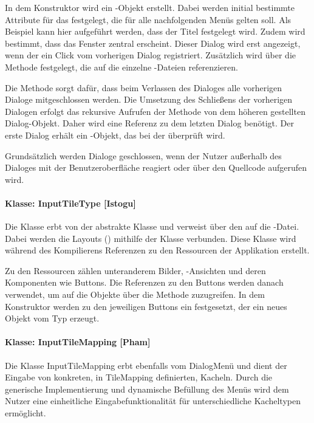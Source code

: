 In dem Konstruktor wird ein -Objekt erstellt. Dabei werden initial bestimmte Attribute für das  festgelegt, die für alle nachfolgenden Menüs gelten soll. Als Beispiel kann hier aufgeführt werden, dass der Titel festgelegt wird. Zudem wird bestimmt, dass das Fenster zentral erscheint. Dieser Dialog wird erst angezeigt, wenn der  ein Click vom vorherigen Dialog registriert. Zusätzlich wird  über die Methode  festgelegt, die auf die einzelne -Dateien referenzieren. 

Die Methode  sorgt dafür, dass beim Verlassen des Dialoges alle vorherigen Dialoge mitgeschlossen werden. Die Umsetzung des Schließens der vorherigen Dialogen erfolgt das rekursive Aufrufen der Methode  von dem höheren gestellten Dialog-Objekt. Daher wird eine Referenz zu dem letzten Dialog benötigt. Der erste Dialog erhält ein -Objekt, das bei der  überprüft wird.   

Grundsätzlich werden Dialoge geschlossen, wenn der Nutzer außerhalb des Dialoges mit der Benutzeroberfläche reagiert oder über den Quellcode  aufgerufen wird.  

\paragraph{Klasse: InputTileType [Istogu]}

Die Klasse erbt von der abstrakte Klasse  und verweist über den  auf die -Datei. Dabei werden die Layouts () mithilfe der Klasse  verbunden. Diese Klasse wird während des Kompilierens Referenzen zu den Ressourcen der Applikation erstellt. 

Zu den Ressourcen zählen unteranderem Bilder, -Ansichten und deren Komponenten wie Buttons. Die Referenzen zu den Buttons werden danach verwendet, um auf die Objekte über die Methode  zuzugreifen. In dem Konstruktor werden zu den jeweiligen Buttons ein  festgesetzt, der ein neues Objekt vom Typ  erzeugt.

\paragraph{Klasse: InputTileMapping [Pham]}
Die Klasse InputTileMapping erbt ebenfalls vom DialogMenü und dient der Eingabe von konkreten, in TileMapping definierten, Kacheln. Durch die generische Implementierung und dynamische Befüllung des Menüs wird dem Nutzer eine einheitliche Eingabefunktionalität für unterschiedliche Kacheltypen ermöglicht. 

